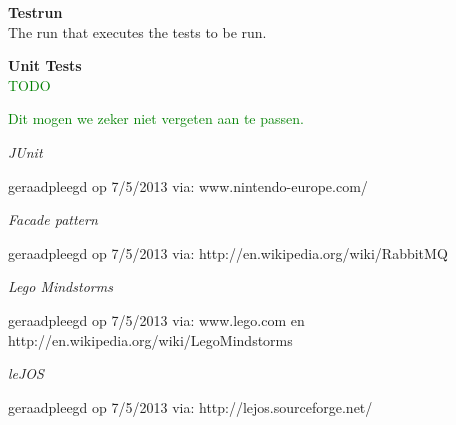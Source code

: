 \documentclass[i2]{oss}
\newcommand{\gloss}[1]{\textbf{#1}}
\newcommand{\comment}[1]{{\huge \textcolor{green}{#1}}\\}
\begin{document}
\begin{description}
\item \gloss{Testrun} \\ 
	The run that executes the tests to be run.


\item \gloss{Unit Tests} \\
\comment{TODO}

 
\end{description}

\newpage
\comment{Dit mogen we zeker niet vergeten aan te passen.}
\begin{flushleft}
\begin{thebibliography}{9}

\textit{JUnit}
\begin{scriptsize}
geraadpleegd op 7/5/2013 via: \mbox{www.nintendo-europe.com/}
\end{scriptsize}

\textit{Facade pattern}
\begin{scriptsize}
geraadpleegd op 7/5/2013 via: \mbox{http://en.wikipedia.org/wiki/RabbitMQ}
\end{scriptsize}

\textit{Lego Mindstorms}
\begin{scriptsize}
geraadpleegd op 7/5/2013 via: \mbox{www.lego.com} en \mbox{http://en.wikipedia.org/wiki/Lego\textendash Mindstorms}
\end{scriptsize}

\textit{leJOS}
\begin{scriptsize}
geraadpleegd op 7/5/2013 via: \mbox{http://lejos.sourceforge.net/}
\end{scriptsize}


\end{thebibliography}
\end{flushleft}

 
\end{document}
